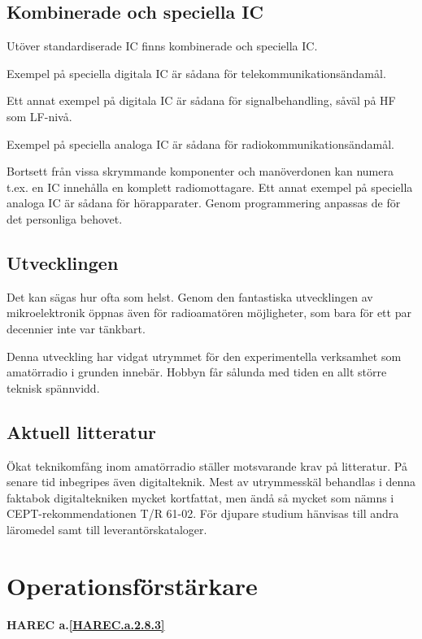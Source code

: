 \subsection{Kombinerade och speciella IC}

Utöver standardiserade IC finns kombinerade och speciella IC.

Exempel på speciella digitala IC är sådana för telekommunikationsändamål.

Ett annat exempel på digitala IC är sådana för signalbehandling, såväl på HF som
LF-nivå.

Exempel på speciella analoga IC är sådana för radiokommunikationsändamål.

Bortsett från vissa skrymmande komponenter och manöverdonen kan numera t.ex. en
IC innehålla en komplett radiomottagare. Ett annat exempel på speciella analoga
IC är sådana för hörapparater. Genom programmering anpassas de för det
personliga behovet.

\subsection{Utvecklingen}

Det kan sägas hur ofta som helst. Genom den fantastiska utvecklingen av
mikroelektronik öppnas även för radioamatören möjligheter, som bara för ett par
decennier inte var tänkbart.

Denna utveckling har vidgat utrymmet för den experimentella verksamhet som
amatörradio i grunden innebär. Hobbyn får sålunda med tiden en allt större
teknisk spännvidd.

\subsection{Aktuell litteratur}

Ökat teknikomfång inom amatörradio ställer motsvarande krav på litteratur. På
senare tid inbegripes även digitalteknik. Mest av utrymmesskäl behandlas i denna
faktabok digitaltekniken mycket kortfattat, men ändå så mycket som nämns i
CEPT-rekommendationen T/R 61-02. För djupare studium hänvisas till andra
läromedel samt till leverantörskataloger.

\section{Operationsförstärkare}
\textbf{
HAREC a.\ref{HAREC.a.2.8.3}\label{myHAREC.a.2.8.3}
}

